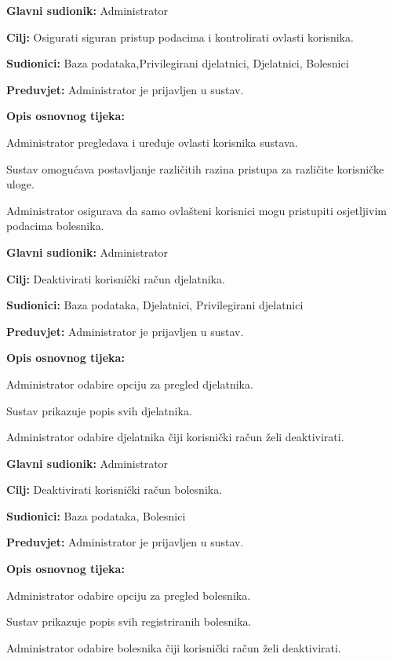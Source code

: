 	\item \textbf{Glavni sudionik:} Administrator
	\item \textbf{Cilj:} Osigurati siguran pristup podacima i kontrolirati ovlasti korisnika.
	\item \textbf{Sudionici:} Baza podataka,Privilegirani djelatnici, Djelatnici, Bolesnici
	\item \textbf{Preduvjet:} Administrator je prijavljen u sustav.
	\item \textbf{Opis osnovnog tijeka:}
	\begin{packed_enum}
		\item Administrator pregledava i uređuje ovlasti korisnika sustava.
		\item Sustav omogućava postavljanje različitih razina pristupa za različite korisničke uloge.
		\item Administrator osigurava da samo ovlašteni korisnici mogu pristupiti osjetljivim podacima bolesnika.
	\end{packed_enum}
\closeusecase

	\item \textbf{Glavni sudionik:} Administrator
	\item \textbf{Cilj:} Deaktivirati korisnički račun djelatnika.
	\item \textbf{Sudionici:} Baza podataka, Djelatnici, Privilegirani djelatnici
	\item \textbf{Preduvjet:} Administrator je prijavljen u sustav.
	\item \textbf{Opis osnovnog tijeka:}
	\begin{packed_enum}
		\item Administrator odabire opciju za pregled djelatnika.
		\item Sustav prikazuje popis svih djelatnika.
		\item Administrator odabire djelatnika čiji korisnički račun želi deaktivirati.
	\end{packed_enum}
\closeusecase

	\item \textbf{Glavni sudionik:} Administrator
	\item \textbf{Cilj:} Deaktivirati korisnički račun bolesnika.
	\item \textbf{Sudionici:} Baza podataka, Bolesnici
	\item \textbf{Preduvjet:} Administrator je prijavljen u sustav.
	\item \textbf{Opis osnovnog tijeka:}
	\begin{packed_enum}
		\item Administrator odabire opciju za pregled bolesnika.
		\item Sustav prikazuje popis svih registriranih bolesnika.
		\item Administrator odabire bolesnika čiji korisnički račun želi deaktivirati.
	\end{packed_enum}
\closeusecase

